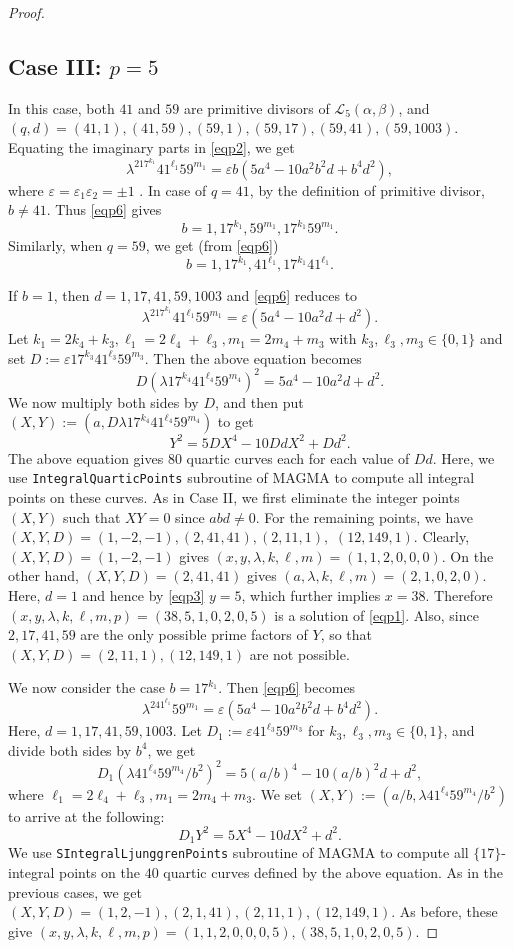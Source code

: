 \documentclass[12pt, 14paper,reqno]{amsart}
\theoremstyle{plain}
\theoremstyle{proof}
\numberwithin{equation}{section}
\begin{document}
\begin{proof}
\subsection*{Case III:  $p=5$} 
In this case, both $41$ and $59$ are primitive divisors of $\mathcal{L}_5(\alpha, \beta)$, and 
$(q, d)=(41, 1), (41, 59), (59, 1), (59, 17), (59, 41), (59, 1003)$. 
Equating the imaginary parts in \eqref{eqp2}, we get 
\begin{equation}\label{eqp6}
\lambda^217^{k_1}41^{\ell_1}59^{m_1}=\varepsilon b(5a^4-10a^2b^2d+b^4d^2),
\end{equation}
where $\varepsilon=\varepsilon_1\varepsilon_2=\pm 1$ . In case of $q=41$,  by the definition of primitive divisor, $b\ne 41$. Thus \eqref{eqp6} gives  
$$b=1,17^{k_1},59^{m_1}, 17^{k_1}59^{m_1}.$$
Similarly, when $q=59$,  we get (from \eqref{eqp6})
$$b=1,17^{k_1}, 41^{\ell_1}, 17^{k_1}41^{\ell_1}.$$

If $b=1$, then $d=1,17,41,59,1003$ and \eqref{eqp6} reduces to
$$\lambda^217^{k_1}41^{\ell_1}59^{m_1}=\varepsilon (5a^4-10a^2d+d^2).$$
Let $k_1=2k_4+k_3, \ell_1=2\ell_4+\ell_3, m_1=2m_4+m_3$ with $k_3,\ell_3, m_3\in\{0,1\}$ and set $D:=\varepsilon 17^{k_3}41^{\ell_3}59^{m_3}$. Then the above equation becomes 
$$D(\lambda 17^{k_4}41^{\ell_4}59^{m_4})^2=5a^4-10a^2d+d^2.$$
We now multiply both sides by $D$, and then put $(X, Y):=(a, D\lambda 17^{k_4}41^{\ell_4}59^{m_4})$ to get
$$Y^2=5DX^4-10DdX^2+Dd^2.$$
The above equation gives $80$ quartic curves each for each value of $Dd$. Here, we use \texttt{IntegralQuarticPoints} subroutine of MAGMA to compute all integral points on these curves. As in Case II, we first eliminate the integer points $(X,Y)$ such that $XY=0$ since $abd\ne0$. For the remaining points, we have $(X,Y, D)=(1,-2,-1), (2,41,41), (2,11,1),$ $ (12,149,1)$. Clearly, $(X,Y, D)=(1,-2,-1)$ gives $(x,y,\lambda,k,\ell,m)=(1,1,2,0,0,0)$. On the other hand, $(X,Y,D)=(2,41,41)$ gives $(a,\lambda, k,\ell, m)=(2,1,0,2,0)$. Here, $d=1$ and hence by \eqref{eqp3} $y=5$, which further implies $x=38$. Therefore $(x,y,\lambda, k, \ell, m, p)=(38,5,1,0,2,0,5)$ is a solution of \ref{eqp1}. Also, since $2,17,41,59$ are the only possible prime factors of $Y$, so that $(X,Y,D)=(2,11,1), (12,149,1)$ are not possible. 



We now consider the case $b=17^{k_1}$.  Then \eqref{eqp6} becomes 
$$\lambda^241^{\ell_1}59^{m_1}=\varepsilon (5a^4-10a^2b^2d+b^4d^2).$$
Here, $d=1,17,41,59,1003$.
Let $D_1:=\varepsilon 41^{\ell_3}59^{m_3}$ for $k_3, \ell_3, m_3\in\{0, 1\}$, and divide both sides by $b^4$, we get
$$D_1(\lambda 41^{\ell_4}59^{m_4}/b^2)^2=5(a/b)^4-10(a/b)^2d+d^2,$$
 where $ \ell_1=2\ell_4+\ell_3, m_1=2m_4+m_3$.
We set $(X, Y):=(a/b, \lambda 41^{\ell_4}59^{m_4}/b^2)$ to arrive at the following:
$$D_1Y^2=5X^4-10dX^2+d^2.$$
We use \texttt{SIntegralLjunggrenPoints} subroutine of MAGMA to compute all $\{17\}$-integral points on the $40$ quartic curves defined by the above equation. As in the previous cases, we get $(X,Y, D)=(1,2,-1), (2,1,41), (2,11,1), (12,149,1)$. 
As before, these give $(x,y,\lambda,k,\ell,m,p)=(1,1,2,0,0,0,5), (38,5,1,0,2,0,5)$.


\end{proof}
\end{document}
